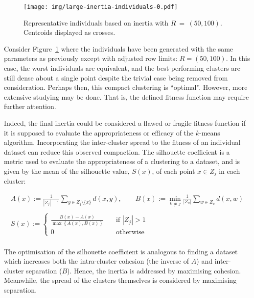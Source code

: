 \begin{figure}[htbp]
    \ContinuedFloat%
    \centering
    \texttt{[image: img/large-inertia-individuals-0.pdf]}
    \caption{%
        \label{figure:large-inertia-individuals}
        Representative individuals based on inertia with \(R~=~(50,100)\).
        Centroids displayed as crosses.
    }
\end{figure}

Consider Figure~\ref{figure:large-inertia-individuals} where the individuals
have been generated with the same parameters as previously except with adjusted
row limits: \(R = (50, 100)\). In this case, the worst individuals are
equivalent, and the best-performing clusters are still dense about a single
point despite the trivial case being removed from consideration. Perhaps then,
this compact clustering is ``optimal''. However, more extensive studying may be
done. That is, the defined fitness function may require further attention.

Indeed, the final inertia could be considered a flawed or fragile fitness
function if it is supposed to evaluate the appropriateness or efficacy of the
\(k\)-means algorithm. Incorporating the inter-cluster spread to the fitness of
an individual dataset can reduce this observed compaction. The silhouette
coefficient is a metric used to evaluate the appropriateness of a clustering to
a dataset, and is given by the mean of the silhouette value, \(S(x)\), of each
point \(x \in Z_j\) in each cluster:

\begin{equation}
    \begin{gathered}
        A(x) := \frac{1}{|Z_j| - 1} \sum_{y \in Z_j \setminus \{x\}} d(x, y),
        \qquad B(x) := \min_{k \neq j} \frac{1}{|Z_k|} \sum_{w \in Z_k} d(x, w)
        \\\\
        S(x) := 
            \begin{cases}
                \frac{B(x) - A(x)}{\max\left\{A(x), B(x)\right\}}
                &\quad \text{if } |Z_j| > 1\\
                0 &\quad \text{otherwise}
            \end{cases}\label{eq:silhouette}
    \end{gathered}
\end{equation}\\

The optimisation of the silhouette coefficient is analogous to finding a dataset
which increases both the intra-cluster cohesion (the inverse of \(A\)) and
inter-cluster separation (\(B\)). Hence, the inertia is addressed by maximising
cohesion. Meanwhile, the spread of the clusters themselves is considered by
maximising separation.

